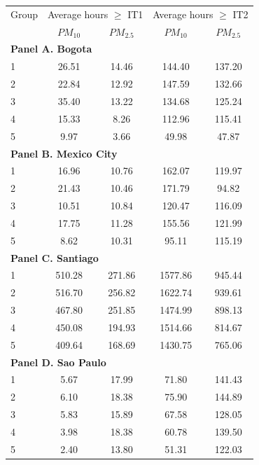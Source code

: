 \begin{tabular}{lcc|cc}
    \toprule
    \toprule
    Group & \multicolumn{2}{c|}{Average hours $\geq$ IT1} & \multicolumn{2}{c}{Average hours $\geq$ IT2} \\
    & $PM_{10}$ & $PM_{2.5}$ & $PM_{10}$ & $PM_{2.5}$ \\
    \midrule
    \multicolumn{5}{l}{\textbf{Panel A. Bogota}} \\
    \midrule
    1 & 26.51 & 14.46 & 144.40 & 137.20 \\
    2 & 22.84 & 12.92 & 147.59 & 132.66 \\
    3 & 35.40 & 13.22 & 134.68 & 125.24 \\
    4 & 15.33 & 8.26 & 112.96 & 115.41 \\
    5 & 9.97 & 3.66 & 49.98 & 47.87 \\
    \midrule
    \multicolumn{5}{l}{\textbf{Panel B. Mexico City}} \\
    \midrule
    1 & 16.96 & 10.76 & 162.07 & 119.97 \\
    2 & 21.43 & 10.46 & 171.79 & 94.82 \\
    3 & 10.51 & 10.84 & 120.47 & 116.09 \\
    4 & 17.75 & 11.28 & 155.56 & 121.99 \\
    5 & 8.62 & 10.31 & 95.11 & 115.19 \\
    \midrule
    \multicolumn{5}{l}{\textbf{Panel C. Santiago}} \\
    \midrule
    1 & 510.28 & 271.86 & 1577.86 & 945.44 \\
    2 & 516.70 & 256.82 & 1622.74 & 939.61 \\
    3 & 467.80 & 251.85 & 1474.99 & 898.13 \\
    4 & 450.08 & 194.93 & 1514.66 & 814.67 \\
    5 & 409.64 & 168.69 & 1430.75 & 765.06 \\
    \midrule
    \multicolumn{5}{l}{\textbf{Panel D. Sao Paulo}} \\
    \midrule
    1 & 5.67 & 17.99 & 71.80 & 141.43 \\
    2 & 6.10 & 18.38 & 75.90 & 144.89 \\
    3 & 5.83 & 15.89 & 67.58 & 128.05 \\
    4 & 3.98 & 18.38 & 60.78 & 139.50 \\
    5 & 2.40 & 13.80 & 51.31 & 122.03 \\
    \bottomrule
    \bottomrule
\end{tabular}
